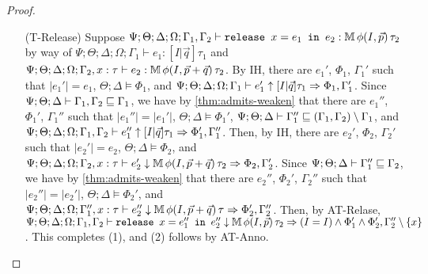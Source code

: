 \begin{proof}
\begin{itemize}
  \item[(T-Release)] Suppose
  $\Psi ; \Theta ; \Delta ; \Omega ; \Gamma_1,\Gamma_2 \vdash \texttt{release } x = e_1 \texttt{ in }e_2 : \mathbb{M} \, \phi(I,\vec{p}) \, \tau_2$ by way of
  $\Psi ; \Theta ; \Delta ; \Omega ; \Gamma_1 \vdash e_1 : [I | \vec{q}] \tau_1$ and
  $\Psi ; \Theta ; \Delta ; \Omega ; \Gamma_2, x : \tau \vdash e_2 : \mathbb{M} \, \phi(I,\vec{p} + \vec{q}) \, \tau_2$.
  By IH, there are $e_1'$, $\Phi_1$, $\Gamma_1'$ such that
  $|e_1'| = e_1$,
  $\Theta ; \Delta \vDash \Phi_1$, and
  $\Psi ; \Theta ; \Delta ; \Omega ; \Gamma_1 \vdash e_1' \uparrow [I|\vec{q}] \tau_1 \Rightarrow \Phi_1,\Gamma_1'$.
  Since $\Psi ; \Theta ;\Delta \vdash \Gamma_1,\Gamma_2 \sqsubseteq \Gamma_1$, we have by \autoref{thm:admits-weaken} that there are $e_1''$, $\Phi_1'$, $\Gamma_1''$ such that
  $|e_1''| = |e_1'|$,
  $\Theta ; \Delta \vDash \Phi_1'$,
  $\Psi ; \Theta ; \Delta \vdash \Gamma_1'' \sqsubseteq (\Gamma_1,\Gamma_2) \setminus \Gamma_1$, and
  $\Psi ; \Theta ; \Delta ; \Omega ; \Gamma_1,\Gamma_2 \vdash e_1'' \uparrow [I|\vec{q}] \tau_1 \Rightarrow \Phi_1',\Gamma_1''$.
  Then, by IH, there are $e_2'$, $\Phi_2$, $\Gamma_2'$ such that
  $|e_2'| = e_2$,
  $\Theta ; \Delta \vDash \Phi_2$, and
  $\Psi ; \Theta ; \Delta ; \Omega ; \Gamma_2, x : \tau \vdash e_2' \downarrow \mathbb{M} \, \phi(I,\vec{p} + \vec{q}) \, \tau_2 \Rightarrow \Phi_2,\Gamma_2'$.
  Since $\Psi ; \Theta ; \Delta \vdash \Gamma_1'' \sqsubseteq \Gamma_2$,
  we have by \autoref{thm:admits-weaken} that there are $e_2''$, $\Phi_2'$, $\Gamma_2''$ such that
  $|e_2''| = |e_2'|$,
  $\Theta ; \Delta \vDash \Phi_2'$, and
  $\Psi ; \Theta ; \Delta ; \Omega ; \Gamma_1'', x : \tau \vdash e_2'' \downarrow \mathbb{M} \, \phi(I,\vec{p} + \vec{q}) \, \tau \Rightarrow \Phi_2',\Gamma_2''$.
  Then, by AT-Relase,
  $\Psi ; \Theta ; \Delta ; \Omega ; \Gamma_1,\Gamma_2 \vdash \texttt{release } x = e_1'' \texttt{ in }e_2'' \downarrow \mathbb{M} \, \phi(I,\vec{p}) \, \tau_2 \Rightarrow (I = I) \wedge \Phi_1' \wedge \Phi_2',\Gamma_2'' \setminus \{x\}$.
  This completes (1), and (2) follows by AT-Anno.
  
  
  

\end{itemize}
\end{proof}
